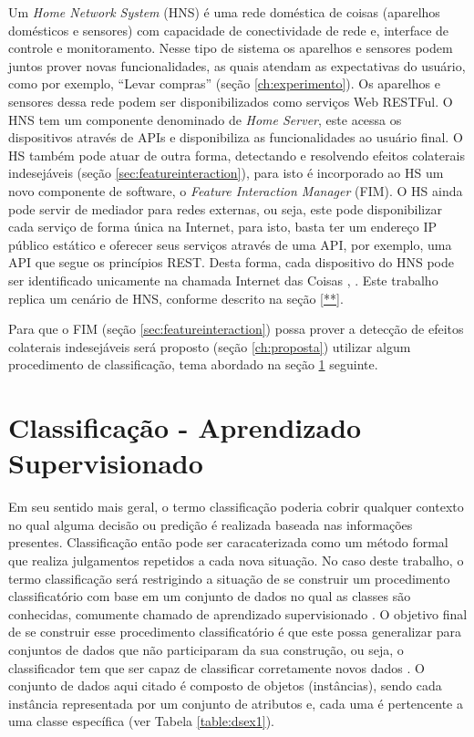 Um \textit{Home Network System} (HNS) é uma rede doméstica de coisas (aparelhos domésticos e sensores) com capacidade de conectividade de rede e, interface de controle e monitoramento. Nesse tipo de sistema os aparelhos e sensores podem juntos prover novas funcionalidades, as quais atendam as expectativas do usuário, como por exemplo, ``Levar compras'' (seção \ref{ch:experimento}). Os aparelhos e sensores dessa rede podem ser disponibilizados como serviços Web RESTFul. O HNS tem um componente denominado de \textit{Home Server}, este acessa os dispositivos através de APIs e disponibiliza as funcionalidades ao usuário final. O HS também pode atuar de outra forma, detectando e resolvendo efeitos colaterais indesejáveis (seção \ref{sec:featureinteraction}), para isto é incorporado ao HS um novo componente de software, o \textit{Feature Interaction Manager} (FIM). O HS ainda pode servir de mediador para redes externas, ou seja, este pode disponibilizar cada serviço de forma única na Internet, para isto, basta ter um endereço IP público estático e oferecer seus serviços através de uma API, por exemplo, uma API que segue os princípios REST. Desta forma, cada dispositivo do HNS pode ser identificado unicamente na chamada Internet das Coisas \cite{Nakamura:2009}, \cite{Ikegami:2013}. Este trabalho replica um cenário de HNS, conforme descrito na seção \ref{**}.

Para que o FIM (seção \ref{sec:featureinteraction}) possa prover a detecção de efeitos colaterais indesejáveis será proposto (seção \ref{ch:proposta}) utilizar algum procedimento de classificação, tema abordado na seção \ref{sec:classificacao} seguinte.

\section{Classificação - Aprendizado Supervisionado}
\label{sec:classificacao}
Em seu sentido mais geral, o termo classificação poderia cobrir qualquer contexto no qual alguma decisão ou predição é realizada baseada nas informações presentes. Classificação então pode ser caracaterizada como um método formal que realiza julgamentos repetidos a cada nova situação. No caso deste trabalho, o termo classificação será restrigindo a situação de se construir um procedimento classificatório com base em um conjunto de dados no qual as classes são conhecidas, comumente chamado de aprendizado supervisionado \cite{Michie:1994}. O objetivo final de se construir esse procedimento classificatório é que este possa generalizar para conjuntos de dados que não participaram da sua construção, ou seja, o classificador tem que ser capaz de classificar corretamente novos dados \cite{Kotsiantis:2007}. O conjunto de dados aqui citado é composto de objetos (instâncias), sendo cada instância representada por um conjunto de atributos e, cada uma é pertencente a uma classe específica (ver Tabela \ref{table:dsex1}).

